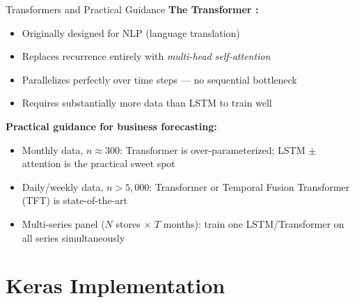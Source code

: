 \documentclass[aspectratio=169, 10pt]{beamer}
\begin{document}
\begin{frame}{Transformers and Practical Guidance}
  \textbf{The Transformer \parencite{Vaswani2017}:}
  \begin{itemize}
    \item Originally designed for NLP (language translation)
    \item Replaces recurrence entirely with \emph{multi-head self-attention}
    \item Parallelizes perfectly over time steps --- no sequential bottleneck
    \item Requires substantially more data than LSTM to train well
  \end{itemize}

  \medskip
  \begin{keybox}
    \textbf{Practical guidance for business forecasting:}
    \begin{itemize}
      \item Monthly data, $n \approx 300$: Transformer is over-parameterized;
            LSTM $\pm$ attention is the practical sweet spot
      \item Daily/weekly data, $n > 5{,}000$: Transformer or
            Temporal Fusion Transformer (TFT) is state-of-the-art
      \item Multi-series panel ($N$ stores $\times$ $T$ months):
            train one LSTM/Transformer on all series simultaneously
    \end{itemize}
  \end{keybox}

  \medskip
\end{frame}

\section{Keras Implementation}

\end{document}
